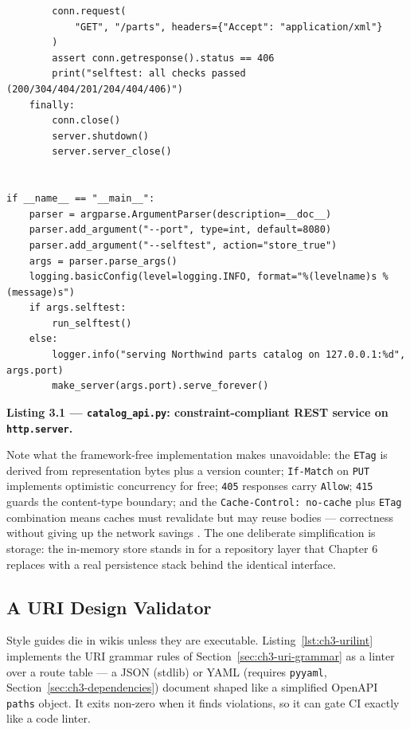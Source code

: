 \begin{verbatim}
        conn.request(
            "GET", "/parts", headers={"Accept": "application/xml"}
        )
        assert conn.getresponse().status == 406
        print("selftest: all checks passed (200/304/404/201/204/404/406)")
    finally:
        conn.close()
        server.shutdown()
        server.server_close()


if __name__ == "__main__":
    parser = argparse.ArgumentParser(description=__doc__)
    parser.add_argument("--port", type=int, default=8080)
    parser.add_argument("--selftest", action="store_true")
    args = parser.parse_args()
    logging.basicConfig(level=logging.INFO, format="%(levelname)s %(message)s")
    if args.selftest:
        run_selftest()
    else:
        logger.info("serving Northwind parts catalog on 127.0.0.1:%d", args.port)
        make_server(args.port).serve_forever()
\end{verbatim}

\noindent\textbf{Listing 3.1 --- \texttt{catalog\_api.py}: constraint-compliant
REST service on \texttt{http.server}.}\label{lst:ch3-catalog}

Note what the framework-free implementation makes unavoidable: the \texttt{ETag}
is derived from representation bytes plus a version counter; \texttt{If-Match} on
\texttt{PUT} implements optimistic concurrency for free; \texttt{405} responses
carry \texttt{Allow}; \texttt{415} guards the content-type boundary; and the
\texttt{Cache-Control: no-cache} plus \texttt{ETag} combination means caches must
revalidate but may reuse bodies --- correctness without giving up the network
savings \cite{rfc9110}. The one deliberate simplification is storage: the
in-memory store stands in for a repository layer that Chapter 6 replaces with a
real persistence stack behind the identical interface.

\subsection{A URI Design Validator}

Style guides die in wikis unless they are executable. Listing~\ref{lst:ch3-urilint}
implements the URI grammar rules of Section~\ref{sec:ch3-uri-grammar} as a linter
over a route table --- a JSON (stdlib) or YAML (requires \texttt{pyyaml},
Section~\ref{sec:ch3-dependencies}) document shaped like a simplified OpenAPI
\texttt{paths} object. It exits non-zero when it finds violations, so it can gate
CI exactly like a code linter.

